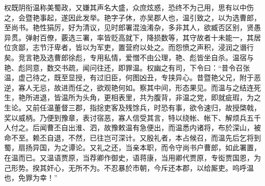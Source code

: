 \documentclass[12pt,UTF8]{ctexbook}
\begin{document}
权既阴衔温称美蜀政，又嫌其声名大盛，众庶炫惑，恐终不为己用，思有以中伤之，会暨艳事起，遂因此发举。艳字子休，亦吴郡人也，温引致之，以为选曹郎，至尚书。艳性狷厉，好为清议，见时郎署混浊淆杂，多非其人，欲臧否区别，贤愚异贯。弹射百僚，覈选三署，率皆贬高就下，降损数等，其守故者十未能一，其居位贪鄙，志节汙卑者，皆以为军吏，置营府以处之。而怨愤之声积，浸润之谮行矣。竞言艳及选曹郎徐彪，专用私情，爱憎不由公理，艳、彪皆坐自杀。温宿与艳、彪同意，数交书疏，闻问往还，即罪温。权幽之有司，下令曰：“昔令召张温，虚己待之，既至显授，有过旧臣，何图凶丑，专挟异心。昔暨艳父兄，附于恶逆，寡人无忌，故进而任之，欲观艳何如。察其中间，形态果见。而温与之结连死生，艳所进退，皆温所为头角，更相表里，共为腹背，非温之党，即就疵瑕，为之生论。又前任温董督三郡，指捴吏客及残馀兵，时恐有事，欲令速归，故授棨戟，奖以威柄。乃便到豫章，表讨宿恶，寡人信受其言，特以绕帐、帐下、解烦兵五千人付之。后闻曹丕自出淮、泗，故豫敕温有急便出，而温悉内诸将，布於深山，被命不至。赖丕自退，不然，已往岂可深计。又殷礼者，本占候召，而温先后乞将到蜀，扇扬异国，为之谭论。又礼之还，当亲本职，而令守尚书户曹郎，如此署置，在温而已。又温语贾原，当荐卿作御史，语蒋康，当用卿代贾原，专衒贾国恩，为己形势。揆其奸心，无所不为。不忍暴於巿朝，今斥还本郡，以给厮吏。呜呼温也，免罪为幸！”
\end{document}
